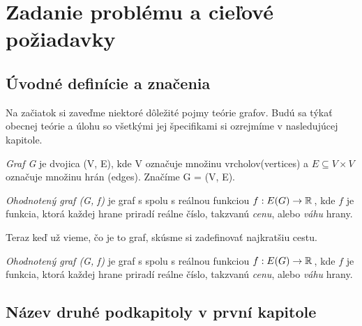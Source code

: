 \chapter{Zadanie problému a cieľové požiadavky}

\section{Úvodné definície a značenia}
Na začiatok si zaveďme niektoré dôležité pojmy teórie grafov.
Budú sa týkať obecnej teórie a úlohu so všetkými jej špecifikami si ozrejmíme v nasledujúcej kapitole.
\begin{define}
{\sl Graf G} je dvojica (V, E), kde V označuje množinu vrcholov(vertices) a $E \subseteq V \times V $ označuje množinu hrán (edges). Značíme G = (V, E).
\end{define}

\begin{define}
{\sl Ohodnotený graf (G, f)} je graf s spolu s reálnou funkciou
$f: E(G) \to \mathbb{R}\,$, kde $f$ je funkcia, ktorá každej hrane priradí
reálne číslo, takzvanú \emph{cenu}, alebo \emph{váhu} hrany.
\end{define}


Teraz keď už vieme, čo je to graf, skúsme si zadefinovať najkratšiu cestu.

\begin{define}
{\sl Ohodnotený graf (G, f)} je graf s spolu s reálnou funkciou
$f: E(G) \to \mathbb{R}\,$, kde $f$ je funkcia, ktorá každej hrane priradí
reálne číslo, takzvanú \emph{cenu}, alebo \emph{váhu} hrany.
\end{define}



\section{Název druhé podkapitoly v první kapitole}

